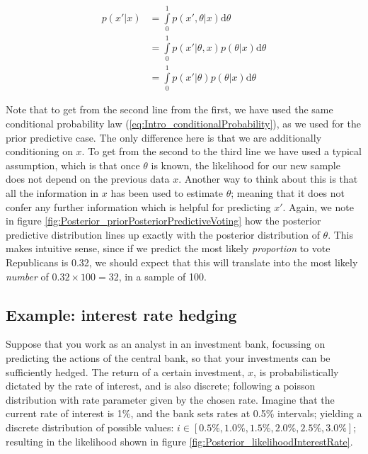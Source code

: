 \documentclass[11pt,fullpage]{book}
\begin{document}
\begin{equation}\label{eq:Posterior_posteriorPredictiveVoting}
\begin{align}
p(x'|x) &= \int\limits_{0}^{1} p(x',\theta|x) \mathrm{d}\theta\\
&= \int\limits_{0}^{1} p(x'|\theta,x) p(\theta|x) \mathrm{d}\theta\\
&= \int\limits_{0}^{1} p(x'|\theta) p(\theta|x) \mathrm{d}\theta
\end{align}
\end{equation}

Note that to get from the second line from the first, we have used the same conditional probability law  (\ref{eq:Intro_conditionalProbability}), as we used for the prior predictive case. The only difference here is that we are additionally conditioning on $x$. To get from the second to the third line we have used a typical assumption, which is that once $\theta$ is known, the likelihood for our new sample does not depend on the previous data $x$. Another way to think about this is that all the information in $x$ has been used to estimate $\theta$; meaning that it does not confer any further information which is helpful for predicting $x'$. Again, we note in figure \ref{fig:Posterior_priorPosteriorPredictiveVoting} how the posterior predictive distribution lines up exactly with the posterior distribution of $\theta$. This makes intuitive sense, since if we predict the most likely \textit{proportion} to vote Republicans is 0.32, we should expect that this will translate into the most likely \textit{number} of $0.32\times 100=32$, in a sample of 100.

\subsection{Example: interest rate hedging}
Suppose that you work as an analyst in an investment bank, focussing on predicting the actions of the central bank, so that your investments can be sufficiently hedged. The return of a certain investment, $x$, is probabilistically dictated by the rate of interest, and is also discrete; following a poisson distribution with rate parameter given by the chosen rate. Imagine that the current rate of interest is 1\%, and the bank sets rates at 0.5\% intervals; yielding a discrete distribution of possible values: $i\in[0.5\%, 1.0\%, 1.5\%, 2.0\%, 2.5\%,3.0\% ]$; resulting in the likelihood shown in figure \ref{fig:Posterior_likelihoodInterestRate}.
\end{document}
